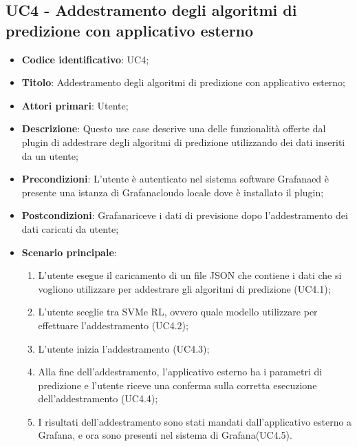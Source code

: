 \subsection{UC4 - Addestramento degli algoritmi di predizione con applicativo esterno}
\begin{itemize}
    \item \textbf{Codice identificativo}: UC4;
    \item \textbf{Titolo}: Addestramento degli algoritmi di predizione con applicativo esterno;
    \item \textbf{Attori primari}: Utente;
    \item \textbf{Descrizione}: Questo use case descrive una delle funzionalità offerte dal plugin di addestrare degli algoritmi di predizione utilizzando dei dati inseriti da un utente;
    \item \textbf{Precondizioni}: L'utente è autenticato nel sistema software Grafana\glosp ed è presente una istanza di Grafana\glosp cloud\glosp o locale dove è installato il plugin;
    \item \textbf{Postcondizioni}: Grafana\glosp riceve i dati di previsione dopo l'addestramento dei dati caricati da utente;
    \item \textbf{Scenario principale}: 
        \begin{enumerate}
            \item L'utente esegue il caricamento di un file JSON che contiene i dati che si vogliono utilizzare per addestrare gli algoritmi di predizione (UC4.1);
            \item L'utente sceglie tra SVM\glosp e RL\glo, ovvero quale modello utilizzare per effettuare l'addestramento (UC4.2);
            \item L'utente inizia l'addestramento (UC4.3);
            \item Alla fine dell'addestramento, l'applicativo esterno ha i parametri di predizione e l'utente riceve una conferma sulla corretta esecuzione dell'addestramento (UC4.4);
            \item I risultati dell'addestramento sono stati mandati dall'applicativo esterno a Grafana\glo, e ora sono presenti nel sistema di Grafana\glosp (UC4.5). 
        \end{enumerate}
\end{itemize}

